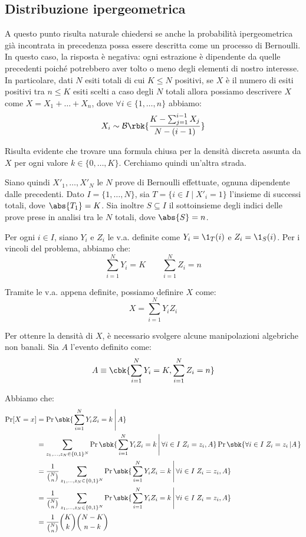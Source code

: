 \documentclass[a4paper, 12pt]{report}
\begin{document}
    \subsection{Distribuzione ipergeometrica}

    A questo punto risulta naturale chiedersi se anche la probabilità ipergeometrica già incontrata in precedenza possa essere descritta come un processo di Bernoulli. In questo caso, la risposta è negativa: ogni estrazione è dipendente da quelle precedenti poiché potrebbero aver tolto o meno degli elementi di nostro interesse. In particolare, dati $N$ esiti totali di cui $K \leq N$ positivi, se $X$ è il numero di esiti positivi tra $n \leq K$ esiti scelti a caso degli $N$ totali allora possiamo descrivere $X$ come $X = X_1 + \ldots + X_n$, dove $\forall i \in \{1, \ldots, n\}$ abbiamo:
    \[X_i \sim \mathcal{B}\rbk{\frac{K-\sum_{j = 1}^{i-1} X_j}{N-(i-1)}}\]

    Risulta evidente che trovare una formula chiusa per la densità discreta assunta da $X$ per ogni valore $k \in \{0, \ldots, K\}$. Cerchiamo quindi un'altra strada.

    Siano quindi $X'_1, \ldots, X'_N$ le $N$ prove di Bernoulli effettuate, ognuna dipendente dalle precedenti. Dato $I = \{1, \ldots, N\}$, sia $T = \{i \in I \mid X'_i = 1\}$ l'insieme di successi totali, dove $\abs{T_1} = K$. Sia inoltre $S \subseteq I$ il sottoinsieme degli indici delle prove prese in analisi tra le $N$ totali, dove $\abs{S} = n$.

    Per ogni $i \in I$, siano $Y_i$ e $Z_i$ le v.a. definite come $Y_i = \1_{T}(i)$ e $Z_i =\1_{S}(i)$. Per i vincoli del problema, abbiamo che:
    \[\sum_{i = 1}^N Y_i = K \qquad \sum_{i = 1}^N Z_i = n\]

    Tramite le v.a. appena definite, possiamo definire $X$ come:
    \[X = \sum_{i = 1}^N Y_iZ_i\]

    Per ottenre la densità di $X$, è necessario svolgere alcune manipolazioni algebriche non banali. Sia $A$ l'evento definito come:
    \[A \equiv \cbk{\sum_{i = 1}^N Y_i = K, \sum_{i = 1}^N Z_i = n}\]

    Abbiamo che:
    \[\begin{split}
        \Pr[X = x] &= \Pr\sbk{\left . \sum_{i = 1}^N Y_iZ_i = k \, \right | A} \\
        &= \sum_{z_1, \ldots, z_N \in \{0,1\}^N} \Pr\sbk{\left . \sum_{i = 1}^N Y_iZ_i = k \, \right | \forall i \in I \; Z_i = z_i, A } \Pr\sbk{\forall i \in I \; Z_i = z_i \left | A \right .}\\
        &= \frac{1}{\binom{N}{n}} \sum_{z_1, \ldots, z_N \in \{0,1\}^N} \Pr\sbk{\left . \sum_{i = 1}^N Y_iZ_i = k \, \right | \forall i \in I \; Z_i = z_i, A} \\
        &= \frac{1}{\binom{N}{n}} \sum_{z_1, \ldots, z_N \in \{0,1\}^N} \Pr\sbk{\left . \sum_{i = 1}^N Y_iZ_i = k \, \right | \forall i \in I \; Z_i = z_i, A} \\
        &= \frac{1}{\binom{N}{n}} \binom{K}{k} \binom{N-K}{n-k} \\
    \end{split}\] 
\end{document}
